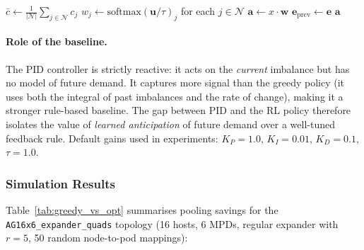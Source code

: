 \documentclass[11pt]{article}
\begin{document}
\begin{algorithm}[H]
\SetAlgoLined
{}
$\bar{c} \leftarrow \frac{1}{|\mathcal{N}|}\sum_{j \in \mathcal{N}} c_j$\;
$w_j \leftarrow \mathrm{softmax}(\mathbf{u} / \tau)_j$ for each $j \in \mathcal{N}$\;
$\mathbf{a} \leftarrow x \cdot \mathbf{w}$\;
$\mathbf{e}_{\text{prev}} \leftarrow \mathbf{e}$\;
\Return $\mathbf{a}$\;
\caption{PID allocation for a single VM arrival.}
\label{alg:pid}
\end{algorithm}

\paragraph{Role of the baseline.}
The PID controller is strictly reactive: it acts on the \emph{current}
imbalance but has no model of future demand.  It captures more signal than
the greedy policy (it uses both the integral of past imbalances and the
rate of change), making it a stronger rule-based baseline.  The gap between
PID and the RL policy therefore isolates the value of \emph{learned
anticipation} of future demand over a well-tuned feedback rule.
Default gains used in experiments: $K_P = 1.0$, $K_I = 0.01$,
$K_D = 0.1$, $\tau = 1.0$.

\subsubsection*{Simulation Results}

Table~\ref{tab:greedy_vs_opt} summarises pooling savings for the
\texttt{AG16x6\_expander\_quads} topology (16 hosts, 6 MPDs, regular
expander with $r = 5$, 50 random node-to-pod mappings):
\end{document}
